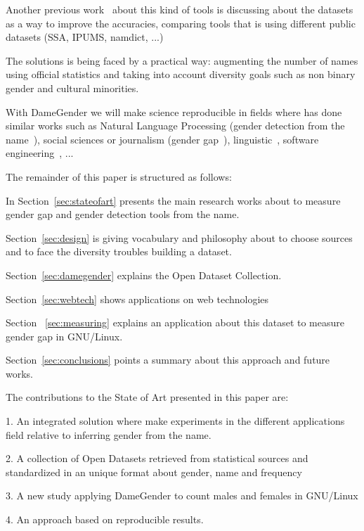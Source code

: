 \documentclass[a4paper]{article}
\begin{document}
Another previous work~\cite{karimi2016inferring} about this kind of
tools is discussing about the datasets as a way to improve the
accuracies, comparing tools that is using different public datasets
(SSA, IPUMS, namdict, ...)

The solutions is being faced by a practical way: augmenting the number
of names using official statistics and taking into account diversity
goals such as non binary gender and cultural minorities.

With DameGender we will make science
reproducible\cite{peng2011reproducible} in fields where has done
similar works such as Natural Language Processing (gender detection
from the name~\cite{sun2019mitigating}), social sciences or journalism
(gender
gap~\cite{holman2018gender,mislove2011understanding,niemi2017gendered,de2014genero}),
linguistic~\cite{hutson2016gender,van2020gender,okal2018linguistic},
software engineering~\cite{vasilescu2012gender}, ...

The remainder of this paper is structured as follows:

In Section~\ref{sec:stateofart} presents the main research works about
to measure gender gap and gender detection tools from the name.

Section~\ref{sec:design} is giving vocabulary and philosophy about to
choose sources and to face the diversity troubles building a dataset.

Section~\ref{sec:damegender} explains the Open Dataset Collection.

Section~\ref{sec:webtech} shows applications on web technologies

Section ~\ref{sec:measuring} explains an application about this
dataset to measure gender gap in GNU/Linux.

Section~\ref{sec:conclusions} points a summary about this approach and
future works.

The contributions to the State of Art presented in this paper are:

1. An integrated solution where make experiments in the different
applications field relative to inferring gender from the name.

2. A collection of Open Datasets retrieved from statistical sources
and standardized in an unique format about gender, name and frequency

3. A new study applying DameGender to count males and females in
GNU/Linux

4. An approach based on reproducible results.
\end{document}
